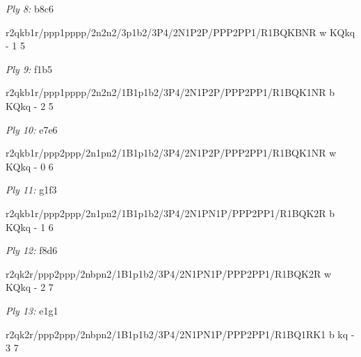 \documentclass{article}
\begin{document}

\showboard

\bigskip

\emph{Ply 8:} b8c6

r2qkb1r/ppp1pppp/2n2n2/3p1b2/3P4/2N1P2P/PPP2PP1/R1BQKBNR w KQkq - 1 5


\showboard

\bigskip

\emph{Ply 9:} f1b5


r2qkb1r/ppp1pppp/2n2n2/1B1p1b2/3P4/2N1P2P/PPP2PP1/R1BQK1NR b KQkq - 2 5


\showboard

\bigskip

\emph{Ply 10:} e7e6

r2qkb1r/ppp2ppp/2n1pn2/1B1p1b2/3P4/2N1P2P/PPP2PP1/R1BQK1NR w KQkq - 0 6


\showboard

\bigskip

\emph{Ply 11:} g1f3


r2qkb1r/ppp2ppp/2n1pn2/1B1p1b2/3P4/2N1PN1P/PPP2PP1/R1BQK2R b KQkq - 1 6


\showboard

\bigskip

\emph{Ply 12:} f8d6

r2qk2r/ppp2ppp/2nbpn2/1B1p1b2/3P4/2N1PN1P/PPP2PP1/R1BQK2R w KQkq - 2 7


\showboard

\bigskip

\emph{Ply 13:} e1g1


r2qk2r/ppp2ppp/2nbpn2/1B1p1b2/3P4/2N1PN1P/PPP2PP1/R1BQ1RK1 b kq - 3 7


\showboard

\bigskip
\end{document}
